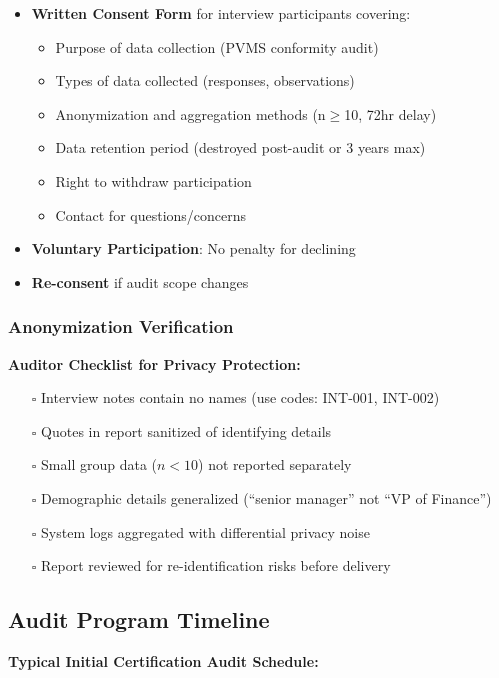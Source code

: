 \documentclass[11pt,a4paper]{article}
\begin{document}
\begin{itemize}
\item \textbf{Written Consent Form} for interview participants covering:
  \begin{itemize}
  \item Purpose of data collection (PVMS conformity audit)
  \item Types of data collected (responses, observations)
  \item Anonymization and aggregation methods (n$\geq$10, 72hr delay)
  \item Data retention period (destroyed post-audit or 3 years max)
  \item Right to withdraw participation
  \item Contact for questions/concerns
  \end{itemize}
\item \textbf{Voluntary Participation}: No penalty for declining
\item \textbf{Re-consent} if audit scope changes
\end{itemize}

\subsubsection{Anonymization Verification}

\textbf{Auditor Checklist for Privacy Protection:}

\begin{itemize}
\item[$\square$] Interview notes contain no names (use codes: INT-001, INT-002)
\item[$\square$] Quotes in report sanitized of identifying details
\item[$\square$] Small group data ($n<10$) not reported separately
\item[$\square$] Demographic details generalized (``senior manager'' not ``VP of Finance'')
\item[$\square$] System logs aggregated with differential privacy noise
\item[$\square$] Report reviewed for re-identification risks before delivery
\end{itemize}

\subsection{Audit Program Timeline}

\textbf{Typical Initial Certification Audit Schedule:}
\end{document}
